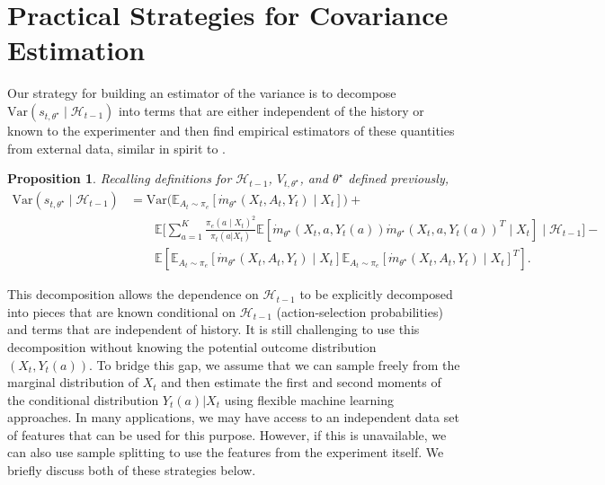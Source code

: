 \documentclass[11pt]{article}
\newcommand{\Hist}{\mathcal{H}}
\newcommand{\E}{\mathbb{E}}
\newcommand{\Var}{\mathrm{Var}}
\newtheorem{proposition}{Proposition}
\begin{document}


\section{Practical Strategies for Covariance Estimation} \label{sec:covariance_estimation}
Our strategy for building an estimator of the variance is to decompose $\Var(s_{t,\theta^{\star}} \mid \mathcal{H}_{t-1})$ into terms that are either independent of the history or known to the experimenter and then find empirical estimators of these quantities from external data, similar in spirit to \cite{kato2020standardized}.

\begin{proposition} \label{prop:variance_decomp}
Recalling definitions for $\mathcal{H}_{t-1}$, $V_{t,\theta^{\star}}$, and $\theta^{\star}$ defined previously,
\begin{align*}
\Var(s_{t,\theta^{\star}} \mid \mathcal{H}_{t-1})
&=\Var\Big(\E_{A_{t} \sim \pi_{e}}  \left[\dot{m}_{\theta^{\star}}(X_t,A_{t},Y_t) \mid X_t\right]\Big) + \\
&\qquad \E \Bigg[\sum_{a=1}^{K} \frac{\pi_e(a \mid X_t)^2}{\pi_t(a|X_t)} 
\E[\dot{m}_{\theta^{\star}}(X_t,a,Y_t(a))\dot{m}_{\theta^{\star}}(X_t,a,Y_t(a))^{T} \mid X_t] \mid \mathcal{H}_{t-1}\Bigg] - \\
 & \qquad \E\left[\E_{A_{t} \sim \pi_{e}}  \left[\dot{m}_{\theta^{\star}}(X_t,A_{t},Y_t) \mid X_t\right]\E_{A_{t} \sim \pi_{e}}  \left[\dot{m}_{\theta^{\star}}(X_t,A_{t},Y_t) \mid X_t\right]^{T} \right].
\end{align*}
\end{proposition}

This decomposition allows the dependence on $\mathcal{H}_{t-1}$ to be explicitly decomposed into pieces that are known conditional on $\mathcal{H}_{t-1}$ (action-selection probabilities) and terms that are independent of history. It is still challenging to use this decomposition without knowing the potential outcome distribution $(X_{t}, Y_{t}(a))$. To bridge this gap, we assume that we can sample freely from the marginal distribution of $X_{t}$ and then estimate the first and second moments of the conditional distribution $Y_{t}(a) | X_{t}$ using flexible machine learning approaches. In many applications, we may have access to an independent data set of features that can be used for this purpose. However, if this is unavailable, we can also use sample splitting to use the features from the experiment itself. We briefly discuss both of these strategies below. 
\end{document}

